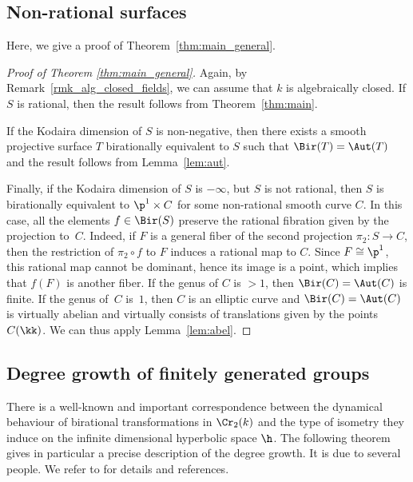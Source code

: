 \subsection{Non-rational surfaces}\label{sec:remarks}
Here, we give a proof of Theorem~\ref{thm:main_general}.

\begin{proof}[Proof of Theorem \ref{thm:main_general}]
{Again, by Remark~\ref{rmk_alg_closed_fields}, we can assume that $k$ is algebraically closed}.
If $S$ is rational, then the result follows from Theorem~\ref{thm:main}.

If the Kodaira dimension of $S$ is non-negative, then there exists a smooth projective surface $T$ birationally equivalent to $S$ such that $\Bir(T)=\Aut(T)$ and the result follows from Lemma~\ref{lem:aut}.

Finally, if the Kodaira dimension of $S$ is $-\infty$, but $S$ is not rational, then $S$ is birationally equivalent to $\p^1\times C$ for some non-rational smooth curve $C$. In this case, all the elements $f\in\Bir(S)$ preserve the rational fibration given by the projection to~$C$. {Indeed, if $F$ is a general fiber of the second projection $\pi_2\colon S\to C$, then the restriction of $\pi_2\circ f$ to $F$ induces a rational map to $C$. Since $F\cong \p^1$, this rational map cannot be dominant, hence its image is a point, which implies that $f(F)$ is another fiber.} If the genus of $C$ is $>1$, then $\Bir(C)=\Aut(C)$ is finite. If the genus of~$C$ is~$1$, then $C$ is an elliptic curve and $\Bir(C)=\Aut(C)$ is virtually abelian and virtually consists of translations given by the points $C(\kk)$. We can thus apply Lemma~\ref{lem:abel}.
\end{proof}

\subsection{Degree growth of finitely generated groups}\label{sec:degrees}

There is a well-known and important correspondence between the dynamical behaviour of birational transformations in $\Cr_2(k)$ and the type of isometry they induce on the infinite dimensional hyperbolic space $\h$. The following theorem gives in particular a precise description of the degree growth. It is due to several people. We refer to \cite{cantat2015cremona} for details and references.

